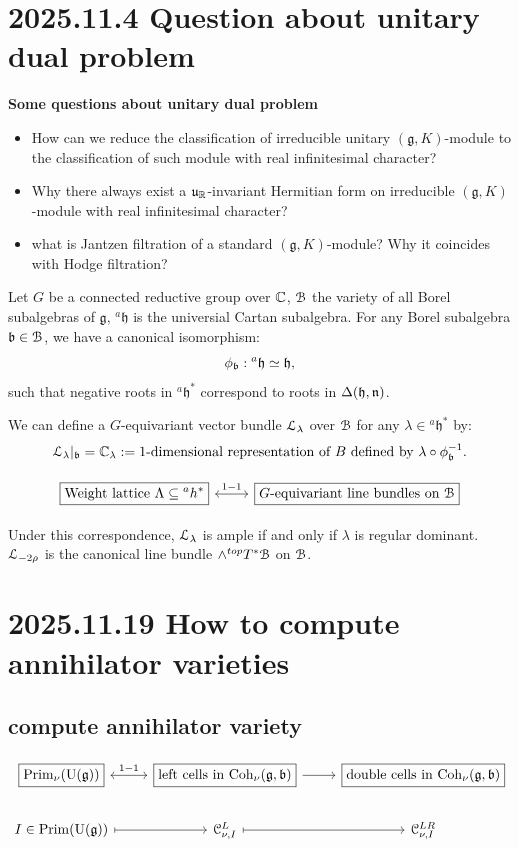 \documentclass[12pt]{amsart}
\numberwithin{equation}{section}
\newcommand{\fg}{\mathfrak{g}} \newcommand{\fh}{\mathfrak{h}} \newcommand{\fk}{\mathfrak{k}}
\newcommand{\fu}{\mathfrak{u}} \newcommand{\fv}{\mathfrak{v}} \newcommand{\fy}{\mathfrak{y}}
\begin{document}
\section{2025.11.4 Question about unitary dual problem}

\textbf{Some questions about unitary dual problem}

\begin{itemize}
  \item How can we reduce the classification of irreducible unitary $(\fg,K)$-module to the classification of such module with real infinitesimal character?
  \item Why there always exist a $\fu_{\BR}$-invariant Hermitian form on irreducible $(\fg,K)$-module with real infinitesimal character?
  \item what is Jantzen filtration of a standard $(\fg,K)$-module? Why it coincides with Hodge filtration?
\end{itemize}


Let $G$ be a connected reductive group over ${\mathbb {C}}$, ${\mathcal {B}}$ the variety of all Borel subalgebras of $\fg$, $^{a}\fh$ is the universial Cartan subalgebra. For any Borel subalgebra $\mathfrak{b} \in {\mathcal {B}}$, we have a canonical isomorphism:
\[\phi_{\fb} : {^{a}\fh} \simeq \fh,\]
such that negative roots in $^{a}\fh^*$ correspond to roots in $\Delta(\fh,\fn)$.

We can define a $G$-equivariant vector bundle ${\mathcal {L}}_{\lambda}$ over ${\mathcal {B}}$ for any $\lambda \in {^{a}\fh}^*$ by:
\[{\mathcal {L}}_{\lambda}|_{\mathfrak{b}} = {\mathbb {C}}_{\lambda} := \textrm{1-dimensional representation of $B$ defined by $\lambda \circ \phi_{\mathfrak{b}}^{-1}$}.\]

\[
\begin{tikzcd}
  \boxed{\text{Weight lattice $\Lambda \subseteq {^{a}h^*}$}} \arrow[r,leftrightarrow,"1-1"] & \boxed{\text{$G$-equivariant line bundles on $\CB$}} 
\end{tikzcd}
\]

Under this correspondence, ${\mathcal {L}}_{\lambda}$ is ample if and only if $\lambda$ is regular dominant. ${\mathcal {L}}_{-2\rho}$ is the canonical line bundle $\wedge^{top}T^*{\mathcal {B}}$ on ${\mathcal {B}}$.




\section{2025.11.19 How to compute annihilator varieties}
\subsection{compute annihilator variety}
\[
  \begin{tikzcd}
    \boxed{\mathrm{Prim}_{\nu}(\mathrm{U}(\fg))} \arrow[r,leftrightarrow,"1-1"] & \boxed{\text{left cells in $\mathrm{Coh}_{\nu}(\fg,\fb)$} } \arrow[r,rightarrow] & \boxed{\text{double cells in $\mathrm{Coh}_{\nu}(\fg,\fb)$}} \\
    I \in \mathrm{Prim}(\mathrm{U}(\fg)) \arrow[r,mapsto] & \mathcal{C}^L_{\nu,I} \arrow[r,mapsto] & \mathcal{C}^{LR}_{\nu,I} 
  \end{tikzcd}
\]
\end{document}
